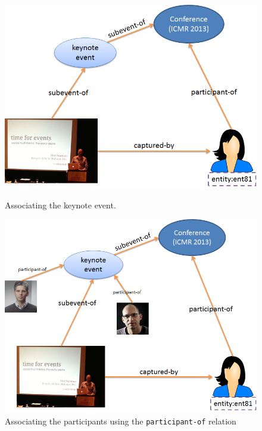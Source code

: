 \begin{figure}[ht!]
\begin{minipage}[b]{0.45\linewidth}
\label{fig:naaman-example-y}
\end{minipage}
\begin{minipage}[b]{0.48\linewidth}
\centering
\includegraphics[width=\textwidth]{media/chapter2/naaman-3.png}
\caption{Associating the keynote event.}
\label{fig:naaman-example-3}
\end{minipage}
\hspace{0.5cm}
\begin{minipage}[b]{0.45\linewidth}
\centering
\includegraphics[width=\textwidth]{media/chapter2/naaman-4.png}
\caption{Associating the participants using the \texttt{participant-of} relation}
\label{fig:naaman-example-4}
\end{minipage}
\end{figure}

